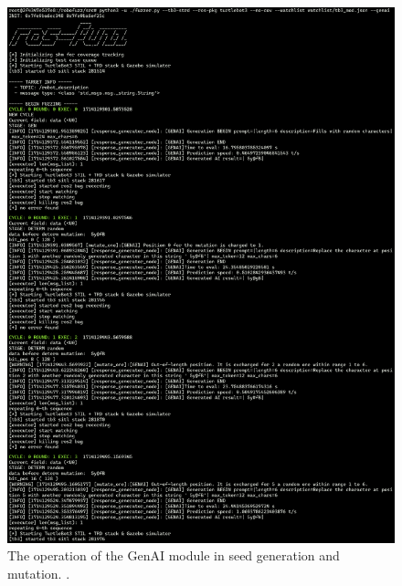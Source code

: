 \begin{figure}[ht!]
    \centering
    \includegraphics[width=1\textwidth]{./figures/data/robofuzz_genai_00_fase1-fase2.png}
    \caption{The operation of the GenAI module in seed generation and mutation.
.}
    \label{fig:robofuzz_genai_00_fase1-fase2}
\end{figure}